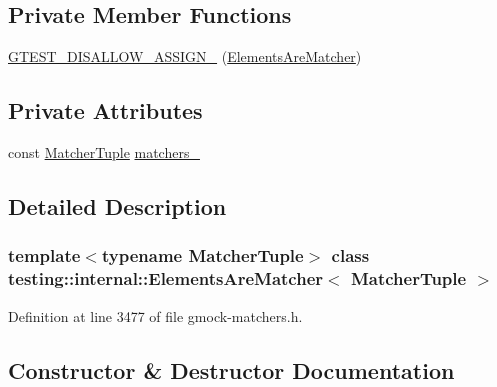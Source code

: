\subsection*{Private Member Functions}
\begin{DoxyCompactItemize}
\item 
\hyperlink{classtesting_1_1internal_1_1ElementsAreMatcher_af5baeeb499b9215912c5c51fbf2a4d2a}{G\+T\+E\+S\+T\+\_\+\+D\+I\+S\+A\+L\+L\+O\+W\+\_\+\+A\+S\+S\+I\+G\+N\+\_\+} (\hyperlink{classtesting_1_1internal_1_1ElementsAreMatcher}{Elements\+Are\+Matcher})
\end{DoxyCompactItemize}
\subsection*{Private Attributes}
\begin{DoxyCompactItemize}
\item 
const \hyperlink{structtesting_1_1internal_1_1MatcherTuple}{Matcher\+Tuple} \hyperlink{classtesting_1_1internal_1_1ElementsAreMatcher_a3e7acc958d30ad5303e8e126d2d1c11e}{matchers\+\_\+}
\end{DoxyCompactItemize}


\subsection{Detailed Description}
\subsubsection*{template$<$typename Matcher\+Tuple$>$\newline
class testing\+::internal\+::\+Elements\+Are\+Matcher$<$ Matcher\+Tuple $>$}



Definition at line 3477 of file gmock-\/matchers.\+h.



\subsection{Constructor \& Destructor Documentation}
\mbox{\label{classtesting_1_1internal_1_1ElementsAreMatcher_a563d71088c4909ab46987e3cd28f2ad6}} 
